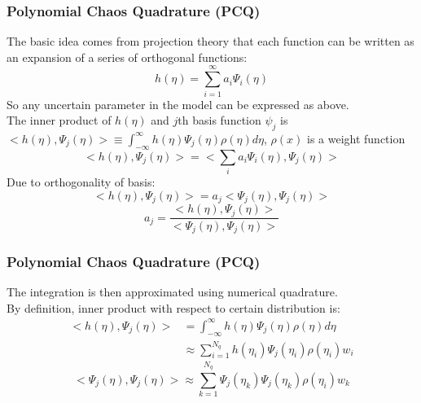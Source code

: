 \documentclass[10pt]{beamer}
\begin{document}
\begin{frame}
\frametitle{Polynomial Chaos Quadrature (PCQ)}
The basic idea comes from projection theory that each function can be written as an expansion of a series of orthogonal functions:\\
\begin{equation}
     h(\eta)= \sum_{i=1}^\infty a_i \Psi_i (\eta) \label{eq:pcq-expansion}  
\end{equation}
So any uncertain parameter in the model can be expressed as above. \\
The inner product of $h(\eta)$ and $j$th basis function $\psi_j$ is $<h(\eta), \Psi_j (\eta) > \equiv \int_{-\infty}^{\infty} h(\eta) \Psi_j (\eta) \rho(\eta) d \eta $, $\rho(x)$ is a weight function
\begin{equation}
     <h(\eta), \Psi_j (\eta) >= <\sum_i a_i \Psi_i (\eta), \Psi_j (\eta)>\label{eq:pcq-inner-product}
\end{equation}
Due to orthogonality of basis:
\begin{equation}
     <h(\eta), \Psi_j (\eta) >= a_j<\Psi_j (\eta), \Psi_j (\eta)> \label{eq:pcq-inner-product-orthogonal}
\end{equation}
\begin{equation}
     a_j= \frac{<h(\eta), \Psi_j (\eta) >}{<\Psi_j (\eta), \Psi_j (\eta)>}\label{eq:pcq-coef}
\end{equation}
\end{frame}
\begin{frame}
\frametitle{Polynomial Chaos Quadrature (PCQ)}
The integration is then approximated using numerical quadrature.\\
By definition, inner product with respect to certain distribution is:
\begin{equation}
\begin{split}
      <h(\eta), \Psi_j (\eta) > &= \int_{-\infty}^{\infty} h(\eta) \Psi_j (\eta) \rho(\eta) d \eta \\
      &\approx \sum_{i=1}^{N_q} h(\eta_i) \Psi_j (\eta_i) \rho(\eta_i) w_i 
\end{split} \label{eq:pcq-gaussian-h} 
\end{equation}
\begin{equation}
      <\Psi_j (\eta), \Psi_j (\eta) > \approx \sum_{k=1}^{N_q} \Psi_j (\eta_k) \Psi_j (\eta_k) \rho(\eta_i)w_k \label{eq:pcq-gaussian-psi} 
\end{equation}
\end{frame}
\end{document}
